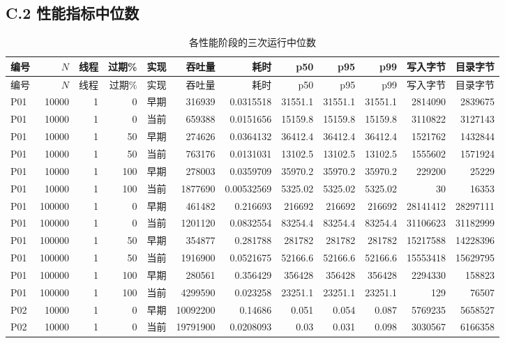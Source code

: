 \documentclass[UTF8,a4paper,10pt,twocolumn,fontset=fandol]{ctexart}
\begin{document}
\subsection*{C.2 性能指标中位数}
\begingroup\scriptsize
\setlength{\tabcolsep}{3pt}
\begin{longtable}{@{}lrrrlrrrrrrr@{}}
\caption{各性能阶段的三次运行中位数}\\
\toprule
编号 & $N$ & 线程 & 过期\% & 实现 & 吞吐量 & 耗时 & p50 & p95 & p99 & 写入字节 & 目录字节 \\
\midrule
\endfirsthead
\toprule
编号 & $N$ & 线程 & 过期\% & 实现 & 吞吐量 & 耗时 & p50 & p95 & p99 & 写入字节 & 目录字节 \\
\midrule
\endhead
\bottomrule
\endfoot
P01 & 10000 & 1 & 0 & 早期 & 316939 & 0.0315518 & 31551.1 & 31551.1 & 31551.1 & 2814090 & 2839675 \\
P01 & 10000 & 1 & 0 & 当前 & 659388 & 0.0151656 & 15159.8 & 15159.8 & 15159.8 & 3110822 & 3127143 \\
P01 & 10000 & 1 & 50 & 早期 & 274626 & 0.0364132 & 36412.4 & 36412.4 & 36412.4 & 1521762 & 1432844 \\
P01 & 10000 & 1 & 50 & 当前 & 763176 & 0.0131031 & 13102.5 & 13102.5 & 13102.5 & 1555602 & 1571924 \\
P01 & 10000 & 1 & 100 & 早期 & 278003 & 0.0359709 & 35970.2 & 35970.2 & 35970.2 & 229200 & 25229 \\
P01 & 10000 & 1 & 100 & 当前 & 1877690 & 0.00532569 & 5325.02 & 5325.02 & 5325.02 & 30 & 16353 \\
P01 & 100000 & 1 & 0 & 早期 & 461482 & 0.216693 & 216692 & 216692 & 216692 & 28141412 & 28297111 \\
P01 & 100000 & 1 & 0 & 当前 & 1201120 & 0.0832554 & 83254.4 & 83254.4 & 83254.4 & 31106623 & 31182999 \\
P01 & 100000 & 1 & 50 & 早期 & 354877 & 0.281788 & 281782 & 281782 & 281782 & 15217588 & 14228396 \\
P01 & 100000 & 1 & 50 & 当前 & 1916900 & 0.0521675 & 52166.6 & 52166.6 & 52166.6 & 15553418 & 15629795 \\
P01 & 100000 & 1 & 100 & 早期 & 280561 & 0.356429 & 356428 & 356428 & 356428 & 2294330 & 158823 \\
P01 & 100000 & 1 & 100 & 当前 & 4299590 & 0.023258 & 23251.1 & 23251.1 & 23251.1 & 129 & 76507 \\
P02 & 10000 & 1 & 0 & 早期 & 10092200 & 0.14686 & 0.051 & 0.054 & 0.087 & 5769235 & 5658527 \\
P02 & 10000 & 1 & 0 & 当前 & 19791900 & 0.0208093 & 0.03 & 0.031 & 0.098 & 3030567 & 6166358 \\

\end{longtable}
\end{document}
